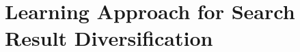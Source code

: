 \documentclass[review]{elsarticle}
\begin{document}


\section{Learning Approach for Search Result Diversification}\label{sec_model}

%
%
\end{document}
